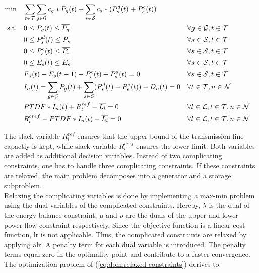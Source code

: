 \begin{subequations}
	\begin{align}
		 \min \quad & \sum_{t\in\mathcal{T}}\sum_{g\in\mathcal{G}}c_g*P_g(t) + \sum_{s\in\mathcal{S}}c_s*(P_s^d(t)+P_s^c(t)) \label{eq:dom:relaxed-constraints}\\
		 \text{s.t.} \quad & 0 \leq P_g(t) \leq \overline{P_g} && \forall g \in \mathcal{G}, t \in \mathcal{T} \\
		 & 0 \leq P_s^d(t) \leq \overline{P_s} && \forall s \in \mathcal{S}, t \in \mathcal{T} \\
		 & 0 \leq P_s^c(t) \leq \overline{P_s} && \forall s \in \mathcal{S}, t \in \mathcal{T} \\
		 & 0 \leq E_s(t) \leq \overline{E_s} && \forall s \in \mathcal{S}, t \in \mathcal{T} \\
		 & E_s(t) - E_s(t-1) - P_s^c(t) + P_s^d(t) = 0 && \forall s \in \mathcal{S}, t \in \mathcal{T} \\
		 & I_n(t) = \sum_{g\in\mathcal{G}}P_g(t) + \sum_{s\in\mathcal{S}}(P_s^d(t)-P_s^c(t))-D_n(t) = 0 && \forall t \in \mathcal{T}, n \in \mathcal{N} \\
		 & PTDF * I_n(t) + R^{ref}_l - \overline{L_l} = 0 && \forall l \in \mathcal{L}, t \in \mathcal{T}, n \in \mathcal{N} \label{eq:dom:con:pf-upper} \\
		 & R^{cref}_l - PTDF * I_n(t) - \overline{L_l} = 0 && \forall l \in \mathcal{L}, t \in \mathcal{T}, n \in \mathcal{N} \label{eq:dom:con:pf-lower}
	\end{align}
\end{subequations}

The slack variable $R_l^{ref}$ ensures that the upper bound of the transmission line capactiy is kept, while slack variable $R_l^{cref}$ ensures the lower limit. Both variables are added as additional decision variables. Instead of two complicating constraints, one has to handle three complicating constraints. If these constraints are relaxed, the main problem decomposes into a generator and a storage subproblem.\\

Relaxing the complicating variables is done by implementing a max-min problem using the dual variables of the complicated constraints. Hereby, $\lambda$ is the dual of the energy balance constraint, $\mu$ and $\rho$ are the duals of the upper and lower power flow constraint respectively. Since the objective function is a linear cost function, \gls{lr} is not applicable. Thus, the complicated constraints are relaxed by applying \gls{alr}. A penalty term for each dual variable is introduced. The penalty terms equal zero in the optimality point and contribute to a faster convergence. The optimization problem of (\ref{eq:dom:relaxed-constraints}) derives to:

